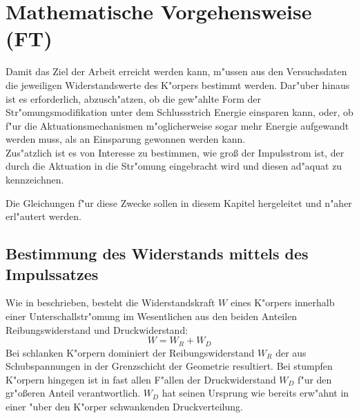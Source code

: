 \chapter{Mathematische Vorgehensweise (FT)}\label{s:widerstandsbestimmung}



Damit das Ziel der Arbeit erreicht werden kann, m"ussen aus den Versuchsdaten die jeweiligen Widerstandswerte des K"orpers bestimmt werden. Dar"uber hinaus ist es erforderlich, abzusch"atzen, ob die gew"ahlte Form der Str"omungsmodifikation unter dem Schlussstrich Energie einsparen kann, oder, ob f"ur die Aktuationsmechanismen m"oglicherweise sogar mehr Energie aufgewandt werden muss, als an Einsparung gewonnen werden kann.\\
Zus"atzlich ist es von Interesse zu bestimmen, wie gro\ss{} der Impulsstrom ist, der durch die Aktuation in die Str"omung eingebracht wird und diesen ad"aquat zu kennzeichnen. 

Die Gleichungen f"ur diese Zwecke sollen in diesem Kapitel hergeleitet und n"aher erl"autert werden.

\section{Bestimmung des Widerstands mittels des Impulssatzes}
\label{sec:WueberImpulssatz}
Wie in  beschrieben, besteht die Widerstandskraft $W$ eines K"orpers innerhalb einer Unterschallstr"omung im Wesentlichen aus den beiden Anteilen Reibungswiderstand und Druckwiderstand:
	\begin{equation}
	\label{eq:W_zusammensetzung}
	W = W_R + W_D
	\end{equation}
Bei schlanken K"orpern dominiert der Reibungswiderstand $W_R$ der aus Schubspannungen in der Grenzschicht der Geometrie resultiert. Bei stumpfen K"orpern hingegen ist in fast allen F"allen der Druckwiderstand $W_D$ f"ur den gr"o\ss{}eren Anteil verantwortlich. $W_D$ hat seinen Ursprung wie bereits erw"ahnt in einer "uber den K"orper schwankenden Druckverteilung.  

